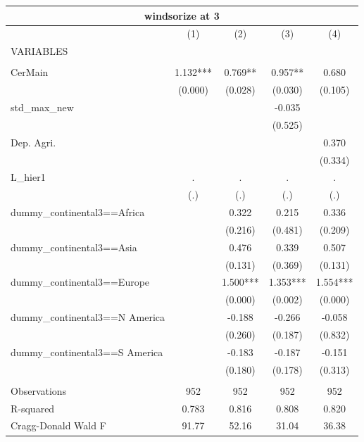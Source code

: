 \begin{tabular}{lcccc}
\multicolumn{5}{c}{windsorize at 3} \\ \hline
 & (1) & (2) & (3) & (4) \\
VARIABLES &  &  &  &  \\ \hline
 &  &  &  &  \\
CerMain & 1.132*** & 0.769** & 0.957** & 0.680 \\
 & (0.000) & (0.028) & (0.030) & (0.105) \\
std\_max\_new &  &  & -0.035 &  \\
 &  &  & (0.525) &  \\
Dep. Agri. &  &  &  & 0.370 \\
 &  &  &  & (0.334) \\
L\_hier1 & . & . & . & . \\
 & (.) & (.) & (.) & (.) \\
dummy\_continental3==Africa &  & 0.322 & 0.215 & 0.336 \\
 &  & (0.216) & (0.481) & (0.209) \\
dummy\_continental3==Asia &  & 0.476 & 0.339 & 0.507 \\
 &  & (0.131) & (0.369) & (0.131) \\
dummy\_continental3==Europe &  & 1.500*** & 1.353*** & 1.554*** \\
 &  & (0.000) & (0.002) & (0.000) \\
dummy\_continental3==N America &  & -0.188 & -0.266 & -0.058 \\
 &  & (0.260) & (0.187) & (0.832) \\
dummy\_continental3==S America &  & -0.183 & -0.187 & -0.151 \\
 &  & (0.180) & (0.178) & (0.313) \\
 &  &  &  &  \\
Observations & 952 & 952 & 952 & 952 \\
R-squared & 0.783 & 0.816 & 0.808 & 0.820 \\
 Cragg-Donald Wald F & 91.77 & 52.16 & 31.04 & 36.38 \\ \hline
\end{tabular}
